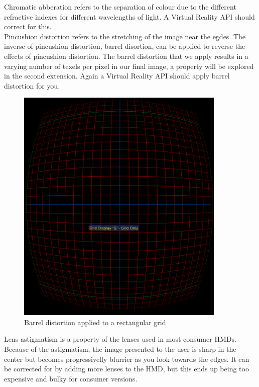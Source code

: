 \documentclass[12pt,a4paper,twoside,openright]{report}
\begin{document}
Chromatic abberation refers to the separation of colour due to the different refractive indexes for different wavelengths of light. A Virtual Reality API should correct for this.\\

Pincushion distortion refers to the stretching of the image near the egdes. The inverse of pincushion distortion, barrel disortion, can be applied to reverse the effects of pincushion distortion. The barrel distortion that we apply results in a varying number of texels per pixel in our final image, a property will be explored in the second extension. Again a Virtual Reality API should apply barrel distortion for you.


\begin{figure}[tbh]
\centerline{\includegraphics[width=10cm]{figs/distortiongrid.png}}
\caption{Barrel distortion applied to a rectangular grid}
\label{distortiongrid}
\end{figure}

Lens astigmatism is a property of the lenses used in most consumer HMDs. Because of the astigmatism, the image presented to the user is sharp in the center but becomes progressivelly blurrier as you look towards the edges.  It can be corrected for by adding more lenses to the HMD, but this ends up being too expensive and bulky for consumer versions.
\end{document}
